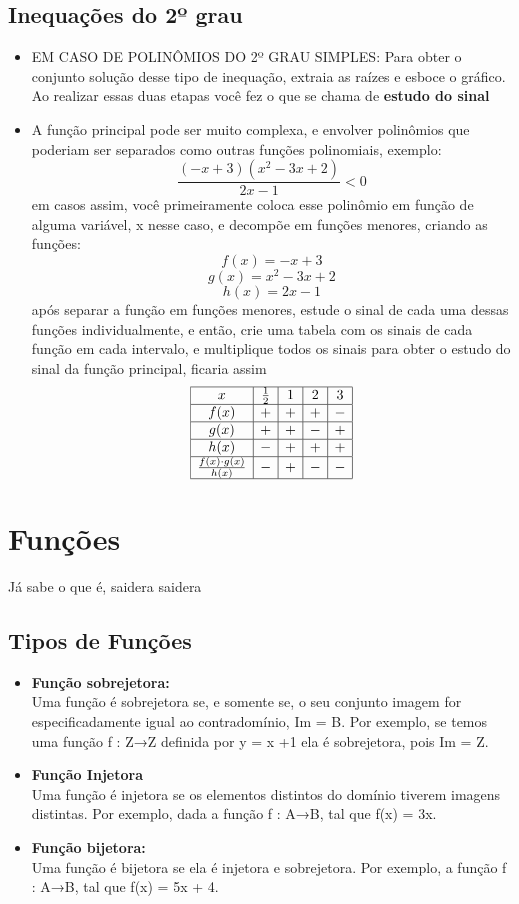 \documentclass{article}
\begin{document}
\subsection{Inequações do 2º grau}
\begin{itemize}
    \item EM CASO DE POLINÔMIOS DO 2º GRAU SIMPLES: Para obter o conjunto solução desse tipo de inequação, extraia as raízes e esboce o gráfico. Ao realizar essas duas etapas você fez o que se chama de \textbf{estudo do sinal}
    \item  A função principal pode ser muito complexa, e envolver polinômios que poderiam ser separados como outras funções polinomiais, exemplo: \[
\frac{(-x + 3)(x^2 - 3x + 2)}{2x - 1} < 0
\] em casos assim, você primeiramente coloca esse polinômio em função de alguma variável, x nesse caso, e decompõe em funções menores, criando as funções: \[
f(x) = -x + 3
\]
\[
g(x) = x^2 - 3x + 2
\]
\[
h(x) = 2x - 1
\] após separar a função em funções menores, estude o sinal de cada uma dessas funções individualmente, e então, crie uma tabela com os sinais de cada função em cada intervalo, e multiplique todos os sinais para obter o estudo do sinal da função principal, ficaria assim
\[
\begin{array}{|c|c|c|c|c|c|}
\hline
x & \frac{1}{2} & 1 & 2 & 3 \\ \hline
f(x) & + & + & + & - \\ \hline
g(x) & + & + & - & + \\ \hline
h(x) & - & + & + & + \\ \hline
\frac{f(x) \cdot g(x)}{h(x)} & - & + & - & - \\ \hline
\end{array}
\]
\end{itemize}

\section{Funções}
Já sabe o que é, saidera saidera

\subsection{Tipos de Funções}
\begin{itemize}
    \item \textbf{Função sobrejetora:}\\[10pt] Uma função é sobrejetora se, e somente se, o seu conjunto imagem for especificadamente igual ao contradomínio, Im = B. Por exemplo, se temos uma função f : Z→Z definida por y = x +1 ela é sobrejetora, pois Im = Z.

    \item \textbf{Função Injetora}\\[10pt] Uma função é injetora se os elementos distintos do domínio tiverem imagens distintas. Por exemplo, dada a função f : A→B, tal que f(x) = 3x.

    \item \textbf{Função bijetora:}\\[10pt] Uma função é bijetora se ela é injetora e sobrejetora. Por exemplo, a função f : A→B, tal que f(x) = 5x + 4.
\end{itemize}
\end{document}
